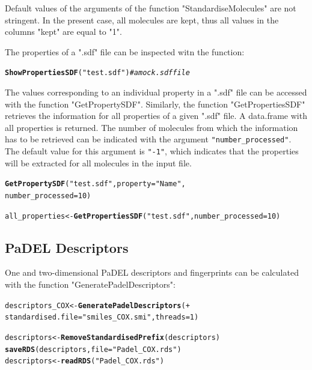 \documentclass[twoside,a4wide,12pt]{article}\usepackage[]{graphicx}\usepackage[]{color}
\makeatletter
\newcommand{\hlnum}[1]{\textcolor[rgb]{0.686,0.059,0.569}{#1}}%
\newcommand{\hlstr}[1]{\textcolor[rgb]{0.192,0.494,0.8}{#1}}%
\newcommand{\hlcom}[1]{\textcolor[rgb]{0.678,0.584,0.686}{\textit{#1}}}%
\newcommand{\hlstd}[1]{\textcolor[rgb]{0.345,0.345,0.345}{#1}}%
\newcommand{\hlkwb}[1]{\textcolor[rgb]{0.69,0.353,0.396}{#1}}%
\newcommand{\hlkwc}[1]{\textcolor[rgb]{0.333,0.667,0.333}{#1}}%
\newcommand{\hlkwd}[1]{\textcolor[rgb]{0.737,0.353,0.396}{\textbf{#1}}}%
\newenvironment{kframe}{%
 \def\at@end@of@kframe{}%
 \ifinner\ifhmode%
  \def\at@end@of@kframe{\end{minipage}}%
  \begin{minipage}{\columnwidth}%
 \fi\fi%
 \def\FrameCommand##1{\hskip\@totalleftmargin \hskip-\fboxsep
 \colorbox{shadecolor}{##1}\hskip-\fboxsep
     \hskip-\linewidth \hskip-\@totalleftmargin \hskip\columnwidth}%
 \MakeFramed {\advance\hsize-\width
   \@totalleftmargin\z@ \linewidth\hsize
   \@setminipage}}%
 {\par\unskip\endMakeFramed%
 \at@end@of@kframe}
\newenvironment{knitrout}{}{} %
\makeatother
\begin{document}
Default values of the arguments of the function "StandardiseMolecules" are not stringent.
In the present case, all molecules are kept, thus all values in the columns "kept"
are equal to "1".

The properties of a ".sdf" file can be inspected witn the function:
\begin{knitrout}
\color{fgcolor}\begin{kframe}
\begin{alltt}
\hlkwd{ShowPropertiesSDF}\hlstd{(}\hlstr{"test.sdf"}\hlstd{)}  \hlcom{# a mock .sdf file}
\end{alltt}
\end{kframe}
\end{knitrout}

The values corresponding to an individual property in a ".sdf" file can be accessed with the function "GetPropertySDF".
Similarly, the function "GetPropertiesSDF" retrieves the information for all properties of a given ".sdf" file.
A data.frame with all properties is returned.
The number of molecules from which the information has to be retrieved can be indicated with the argument \verb|"number_processed"|.
The default value for this argument is \verb|"-1"|, which indicates that the properties will be extracted for all molecules in the input file.
\begin{knitrout}
\color{fgcolor}\begin{kframe}
\begin{alltt}
\hlkwd{GetPropertySDF}\hlstd{(}\hlstr{"test.sdf"}\hlstd{,}\hlkwc{property}\hlstd{=}\hlstr{"Name"}\hlstd{,}
               \hlkwc{number_processed}\hlstd{=}\hlnum{10}\hlstd{)}

\hlstd{all_properties} \hlkwb{<-} \hlkwd{GetPropertiesSDF}\hlstd{(}\hlstr{"test.sdf"}\hlstd{,}\hlkwc{number_processed}\hlstd{=}\hlnum{10}\hlstd{)}
\end{alltt}
\end{kframe}
\end{knitrout}


\subsection{PaDEL Descriptors}
One and two-dimensional PaDEL\cite{padel} descriptors and fingerprints can be calculated with the function "GeneratePadelDescriptors":
\begin{knitrout}
\color{fgcolor}\begin{kframe}
\begin{alltt}
descriptors_COX <- \hlkwd{GeneratePadelDescriptors}( +
  standardised.file=\hlstr{"smiles_COX.smi"},threads = 1)

descriptors <- \hlkwd{RemoveStandardisedPrefix}(descriptors)
\hlkwd{saveRDS}(descriptors, file=\hlstr{"Padel_COX.rds"})
descriptors <- \hlkwd{readRDS}(\hlstr{"Padel_COX.rds"})
\end{alltt}
\end{kframe}
\end{knitrout}
\end{document}
